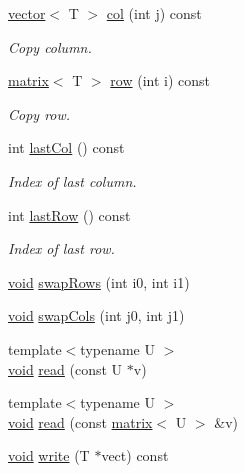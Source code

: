 \begin{DoxyCompactItemize}
\hyperlink{classlibNumerics_1_1vector}{vector}$<$ T $>$ \hyperlink{classlibNumerics_1_1matrix_ab67c4f9413dcaf8a8352f843894e51a2}{col} (int j) const 
\begin{DoxyCompactList}\small\item\em Copy column. \end{DoxyCompactList}\item 
\hyperlink{classlibNumerics_1_1matrix}{matrix}$<$ T $>$ \hyperlink{classlibNumerics_1_1matrix_a21bffd86cceb2f390cdb3143f377ad04}{row} (int i) const 
\begin{DoxyCompactList}\small\item\em Copy row. \end{DoxyCompactList}\item 
int \hyperlink{classlibNumerics_1_1matrix_a99a20157b3bd99b8a4814e831853adb8}{last\+Col} () const 
\begin{DoxyCompactList}\small\item\em Index of last column. \end{DoxyCompactList}\item 
int \hyperlink{classlibNumerics_1_1matrix_a980d6a73aafcbcdebca70dd8ef3cb34b}{last\+Row} () const 
\begin{DoxyCompactList}\small\item\em Index of last row. \end{DoxyCompactList}\item 
\hyperlink{png_8h_aa8c59027f9ab2769342f248709d68d17}{void} \hyperlink{classlibNumerics_1_1matrix_a26170160d342acc7321ac42355c630fa}{swap\+Rows} (int i0, int i1)
\item 
\hyperlink{png_8h_aa8c59027f9ab2769342f248709d68d17}{void} \hyperlink{classlibNumerics_1_1matrix_ab2a597ff7ba97b59afd1fa70184f2b49}{swap\+Cols} (int j0, int j1)
\item 
{\footnotesize template$<$typename U $>$ }\\\hyperlink{png_8h_aa8c59027f9ab2769342f248709d68d17}{void} \hyperlink{classlibNumerics_1_1matrix_a0c4f934f4179272ad79d37cf0a405379}{read} (const U $\ast$v)
\item 
{\footnotesize template$<$typename U $>$ }\\\hyperlink{png_8h_aa8c59027f9ab2769342f248709d68d17}{void} \hyperlink{classlibNumerics_1_1matrix_aa4dc5fe7cd506d20552b865f7c92cfc1}{read} (const \hyperlink{classlibNumerics_1_1matrix}{matrix}$<$ U $>$ \&v)
\item 
\hyperlink{png_8h_aa8c59027f9ab2769342f248709d68d17}{void} \hyperlink{classlibNumerics_1_1matrix_a8ac057f5dbb927f36cb111fd92cc2381}{write} (T $\ast$vect) const 
\end{DoxyCompactItemize}
